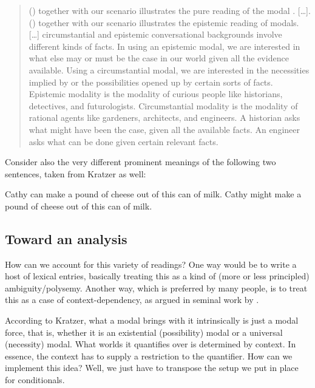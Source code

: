 \begin{quotation}
	\medskip (\blastx) together with our scenario illustrates the pure
   reading of the modal . [\dots ].
  (\lastx) together with our scenario illustrates the epistemic reading of
  modals. [\dots] circumstantial and epistemic conversational backgrounds
  involve different kinds of facts. In using an epistemic modal, we are
  interested in what else may or must be the case in our world given all the
  evidence available. Using a circumstantial modal, we are interested in the
  necessities implied by or the possibilities opened up by certain sorts of
  facts. Epistemic modality is the modality of curious people like historians,
  detectives, and futurologists. Circumstantial modality is the modality of
  rational agents like gardeners, architects, and engineers. A historian asks
  what might have been the case, given all the available facts. An engineer asks
  what can be done given certain relevant facts.
\end{quotation}

\noindent Consider also the very different prominent meanings of the following
two sentences, taken from Kratzer as well:

\pex \a Cathy can make a pound of cheese out of this can of milk. 
\a Cathy might make a pound of cheese out of this can of milk. \xe

\subsection{Toward an analysis}
\label{sec:modal-analysis}

How can we account for this variety of readings? One way would be to write a
host of lexical entries, basically treating this as a kind of (more or less
principled) ambiguity/polysemy. Another way, which is preferred by many people,
is to treat this as a case of context-dependency, as argued in seminal work by
\citet{kratzer-1977-must-can, kratzer-1978-dissertation,
  kratzer-1981-notional,kratzer-1991-modality}.

%
According to Kratzer, what a modal brings with it intrinsically is just a modal
force, that is, whether it is an existential (possibility) modal or a universal
(necessity) modal. What worlds it quantifies over is determined by context. In
essence, the context has to supply a restriction to the quantifier. How can we
implement this idea? Well, we just have to transpose the setup we put in place
for conditionals.

